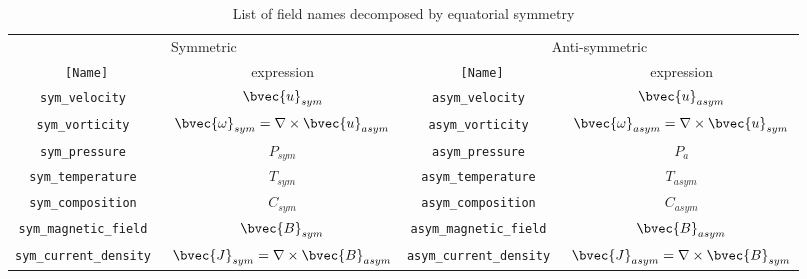 \begin{table}[htp]
\caption{List of field names decomposed by equatorial symmetry}
\begin{center}
\begin{tabular}{|cc|cc|}
\hline
\multicolumn{2}{|c|}{Symmetric} & \multicolumn{2}{c|}{Anti-symmetric} \\
 {\tt [Name]}  & expression  & {\tt [Name]}  &  expression \\ \hline \hline
\tt sym\_velocity &  $\bvec{u}_{sym}$ &  \tt asym\_velocity &  $\bvec{u}_{asym}$  \\
\tt sym\_vorticity & $\bvec{\omega}_{sym} = \nabla \times \bvec{u}_{asym} $
     & \tt asym\_vorticity & $\bvec{\omega}_{asym} = \nabla \times \bvec{u}_{sym} $ \\
\tt sym\_pressure  & $P_{sym}$  & \tt asym\_pressure  & $P_{a}$ \\ \hline
\tt sym\_temperature & $T_{sym}$ & \tt asym\_temperature  & $T_{asym}$ \\
\tt sym\_composition & $C_{sym}$ & \tt asym\_composition & $C_{asym}$ \\ \hline
\tt sym\_magnetic\_field & $\bvec{B}_{sym}$ & \tt asym\_magnetic\_field  & $\bvec{B}_{asym}$ \\
\tt sym\_current\_density & $\bvec{J}_{sym} = \nabla \times \bvec{B}_{asym} $
     & \tt asym\_current\_density  & $\bvec{J}_{asym} = \nabla \times \bvec{B}_{sym} $ \\ \hline
\end{tabular}
\end{center}
\label{table:fields_sym}
\end{table}
%
%
